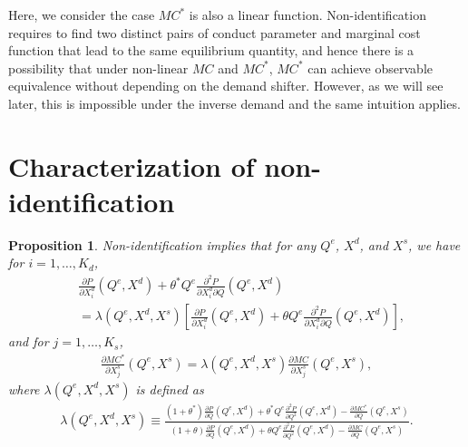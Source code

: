 \documentclass[11pt, a4paper]{article}
\newtheorem{proposition}{Proposition}
\theoremstyle{remark}
\begin{document}
Here, we consider the case $MC^{*}$ is also a linear function.
Non-identification requires to find two distinct pairs of conduct parameter and marginal cost function that lead to the same equilibrium quantity, and hence there is a possibility that under non-linear $MC$ and $MC^{*}$, $MC^{*}$ can achieve observable equivalence without depending on the demand shifter.
However, as we will see later, this is impossible under the inverse demand and the same intuition applies.




\section{Characterization of non-identification}\label{sec:non-identification_characterization}





\begin{proposition}\label{proposition:non-identification_charaterization}
    Non-identification implies that for any $Q^e$, $X^{d}$, and $X^{s}$, we have for $i = 1, \ldots, K_d$,
    \begin{align}
        &\frac{\partial P}{\partial X^{d}_{i}}(Q^e, X^{d}) + \theta^{*} Q^e \frac{\partial^2 P}{\partial X^{d}_{i}\partial Q}(Q^e, X^{d})\\  
        &= \lambda(Q^e, X^{d}, X^{s})\left[ \frac{\partial P}{\partial X^{d}_{i}}(Q^e, X^{d}) + \theta Q^e \frac{\partial^2 P}{\partial X^{d}_{i}\partial Q}(Q^e, X^{d}) \right], \label{eq:nonidentification_demand}
    \end{align}
    and for $j = 1,\ldots, K_s$,
    \begin{align}
        \frac{\partial MC^{*}}{\partial X^{s}_j}(Q^e, X^{s}) = \lambda(Q^e, X^{d}, X^{s}) \frac{\partial MC}{\partial X^{s}_j}(Q^e, X^{s}),\label{eq:nonidentification_marginal_cost}
    \end{align}
    where $\lambda(Q^e, X^{d}, X^{s})$ is defined as
    \begin{align}
        \lambda(Q^e, X^{d}, X^{s}) \equiv \frac{(1+\theta^{*})\frac{\partial P}{\partial Q}(Q^e, X^{d}) + \theta^{*} Q^e\frac{\partial^2 P}{\partial Q^2}(Q^e, X^{d}) - \frac{\partial MC^{*}}{\partial Q}(Q^e, X^{s})}{(1+\theta)\frac{\partial P}{\partial Q}(Q^e, X^{d}) + \theta Q^e\frac{\partial^2 P}{\partial Q^2}(Q^e, X^{d}) - \frac{\partial MC}{\partial Q}(Q^e, X^{s})}. \label{eq:lambda_foc}
    \end{align}
\end{proposition}
\end{document}
